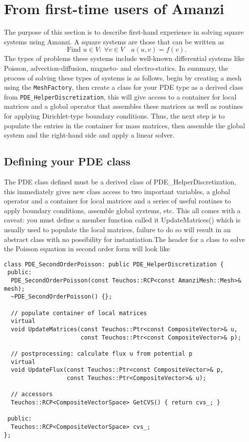 
\section{From first-time users of Amanzi}
The purpose of this section is to describe first-hand experience in solving square 
systems using Amanzi. 
A square systems are those that can be written as
%
\begin{equation}
  \mbox{Find }u\in V:\;\forall v\in V\quad
  a(u,v) = f(v).
\end{equation}
The types of problems these systems include well-known differential systems like Poisson, advection-diffusion, 
magneto- and electro-statics. 
In summary, the process of solving these types of systems is as follows, begin by creating a mesh using the
{\tt MeshFactory}, then create a class for your PDE type as a derived class from {\tt PDE\_HelperDiscretization}, 
this will give access to a container for local matrices and a global operator that assembles these matrices as 
well as routines for applying Dirichlet-type boundary conditions. 
Thus, the next step is to populate the entries in the container for mass matrices, then assemble the global 
system and the right-hand side and apply a linear solver.


\subsection{Defining your PDE class}\label{Sec:PDEClass}
The PDE class defined must be a derived class of PDE\_HelperDiscretization, this immediately gives 
new class access to two important variables, a global operator and a container for local matrices and a series of useful routines to apply boundary conditions, assemble global systems, etc. This all comes with a caveat: you must define a member function called {it UpdateMatrices()} which is usually used to populate the local matrices, failure to do so will result in an abstract class with no possibility for instantiation.The header for a class to solve the Poisson equation in second order form will look like
%
\begin{lstlisting}
class PDE_SecondOrderPoisson: public PDE_HelperDiscretization {
 public:
  PDE_SecondOrderPoisson(const Teuchos::RCP<const AmanziMesh::Mesh>& mesh);
  ~PDE_SecondOrderPoisson() {};

  // populate container of local matrices
  virtual
  void UpdateMatrices(const Teuchos::Ptr<const CompositeVector>& u,
                      const Teuchos::Ptr<const CompositeVector>& p);
		
  // postprocessing: calculate flux u from potential p
  virtual
  void UpdateFlux(const Teuchos::Ptr<const CompositeVector>& p,
                  const Teuchos::Ptr<CompositeVector>& u);
		
  // accessors
  Teuchos::RCP<CompositeVectorSpace> GetCVS() { return cvs_; }

 public:
  Teuchos::RCP<CompositeVectorSpace> cvs_;
};
\end{lstlisting}

